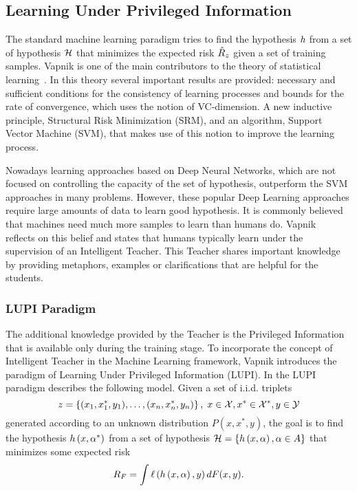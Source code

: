 \subsection{Learning Under Privileged Information}\label{subsec:ch3_lupi}
The standard machine learning paradigm tries to find the hypothesis $h$ from a set of hypothesis $\mathcal{H}$ that minimizes the expected risk $\hat{R}_z$ given a set of training samples.
Vapnik is one of the main contributors to the theory of statistical learning~\cite{vapnik2013nature}. In this theory several important results are provided: necessary and sufficient conditions for the consistency of learning processes and bounds for the rate of convergence, which uses the notion of VC-dimension. A new inductive principle, Structural Risk Minimization (SRM), and an algorithm, Support Vector Machine (SVM), that makes use of this notion to improve the learning process.

Nowadays learning approaches based on Deep Neural Networks, which are not focused on controlling the capacity of the set of hypothesis, outperform the SVM approaches in many problems. However, these popular Deep Learning approaches require large amounts of data to learn good hypothesis.
It is commonly believed that machines need much more samples to learn than humans do. Vapnik~\cite{VapnikV09, VapnikI15a} reflects on this belief and states that humans typically learn under the supervision of an Intelligent Teacher.
This Teacher shares important knowledge by providing metaphors, examples or clarifications that are helpful for the students.



\subsubsection*{LUPI Paradigm}
The additional knowledge provided by the Teacher is the Privileged Information that is available only during the training stage.
To incorporate the concept of Intelligent Teacher in the Machine Learning framework, Vapnik introduces the paradigm of Learning Under Privileged Information (LUPI).
In the LUPI paradigm describes the following model. Given a set of i.i.d. triplets
$$ z = \left\{(x_1, x^*_1, y_1), \ldots, (x_n,x^*_n, y_n)\right\}, \; x \in \mathcal{X}, x^* \in \mathcal{X}^*, y \in \mathcal{Y} $$
generated according to an unknown distribution $P(x, x^*, y)$, the goal is to find the hypothesis $h\left(x, \alpha^*\right)$ from a set of hypothesis $\mathcal{H} = \left\{h\left(x, \alpha\right), \alpha \in A\right\}$ that minimizes some expected risk 
$$ R_F = \int \ell\left( h\left(x, \alpha\right), y\right) dF(x, y). $$

